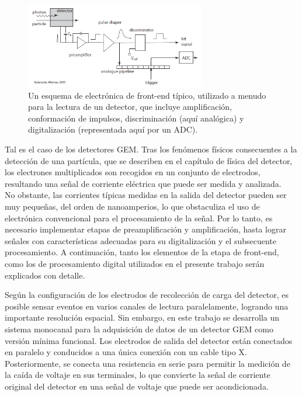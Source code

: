 \documentclass[]{book}
\begin{document}
\begin{figure}[h]
    \centering
    \includegraphics[width=0.7\textwidth]{typical_readout_electronics.PNG}
    \caption{Un esquema de electrónica de front-end típico, utilizado a menudo para la lectura de un
    detector, que incluye amplificación, conformación de impulsos, discriminación
    (aquí analógica) y digitalización (representada aquí por un ADC).}
    \label{fig:generic_frontend}

\end{figure}
    
\noindent Tal es el caso de los detectores GEM. Tras los fenómenos físicos consecuentes a la detección de una partícula, que se describen en el capítulo de física del detector, los electrones multiplicados son recogidos en un conjunto de electrodos, resultando una señal de corriente eléctrica que puede ser medida y analizada.\\

\noindent No obstante, las corrientes típicas medidas en la salida del detector pueden ser muy pequeñas, del orden de nanoamperios, lo que obstaculiza el uso de electrónica convencional para el procesamiento de la señal. Por lo tanto, es necesario implementar etapas de preamplificación y amplificación, hasta lograr señales con características adecuadas para su digitalización y el subsecuente procesamiento. A continuación, tanto los elementos de la etapa de front-end, como los de procesamiento digital utilizados en el presente trabajo serán explicados con detalle.

\noindent Según la configuración de los electrodos de recolección de carga del detector, es posible sensar eventos en varios canales de lectura paralelamente, logrando una importante resolución espacial. Sin embargo, en este trabajo se desarrolla un sistema monocanal para la adquisición de datos de un detector GEM como versión mínima funcional. Los electrodos de salida del detector están conectados en paralelo y conducidos a una única conexión con un cable tipo X. Posteriormente, se conecta una resistencia en serie para permitir la medición de la caída de voltaje en sus terminales, lo que convierte la señal de corriente original del detector en una señal de voltaje que puede ser acondicionada.\\
\end{document}
